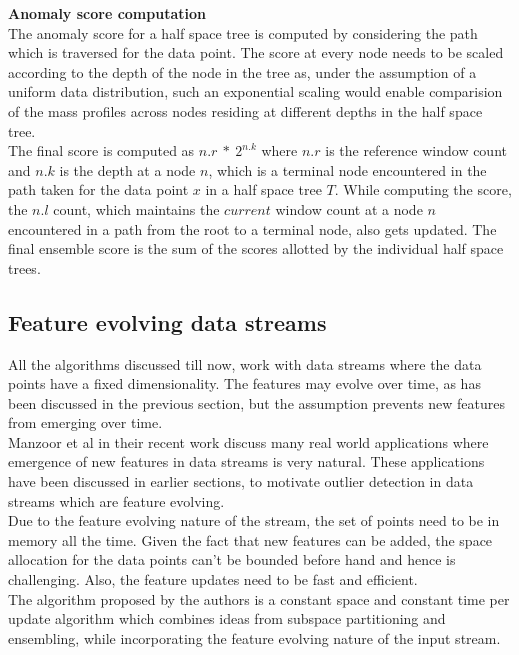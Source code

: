 \noindent \textbf{Anomaly score computation} \\

The anomaly score for a half space tree is computed by considering the path which is traversed for the data point. The score at every node needs to be scaled according to the depth of the node in the tree as, under the assumption of a uniform data distribution, such an exponential scaling would enable comparision of the mass profiles across nodes residing at different depths in the half space tree. \\ 

The final score is computed as $n.r\ *\ 2^{n.k}$ where $n.r$ is the reference window count and $n.k$ is the depth at a node $n$, which is a terminal node encountered in the path taken for the data point $x$ in a half space tree $T$. While computing the score, the $n.l$ count, which maintains the $current$ window count at a node $n$ encountered in a path from the root to a terminal node, also gets updated. The final ensemble score is the sum of the scores allotted by the individual half space trees. 

\subsection{Feature evolving data streams}

All the algorithms discussed till now, work with data streams where the data points have a fixed dimensionality. The features may evolve over time, as has been discussed in the previous section, but the assumption prevents new features from emerging over time. \\

Manzoor et al in their recent work\cite{Manzoor:2018:XOD:3219819.3220107} discuss many real world applications where emergence of new features in data streams is very natural. These applications have been discussed in earlier sections, to motivate outlier detection in data streams which are feature evolving. \\ 

Due to the feature evolving nature of the stream, the set of points need to be in memory all the time. Given the fact that new features can be added, the space allocation for the data points can't be bounded before hand and hence is challenging. Also, the feature updates need to be fast and efficient. \\

The algorithm proposed by the authors is a constant space and constant time per update algorithm which combines ideas from subspace partitioning and ensembling, while incorporating the feature evolving nature of the input stream. \\

